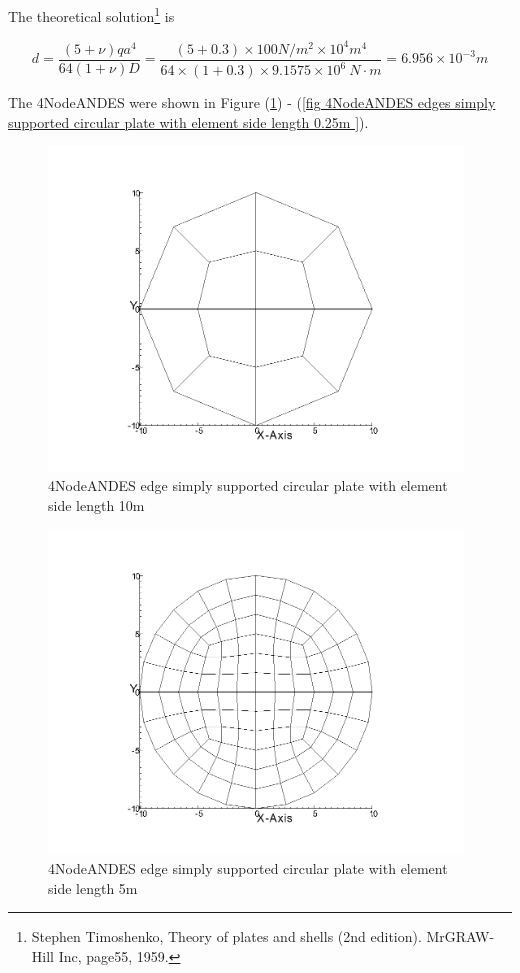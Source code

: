 \documentclass[fleqn,11pt,letter]{article}
\begin{document}
The theoretical solution\footnote{Stephen Timoshenko, Theory of plates and shells (2nd edition). MrGRAW-Hill Inc, page55, 1959.} is 

\begin{equation}
  d= \frac{(5+\nu)  q a^4}{64(1+\nu) D}=\frac{(5+0.3)\times 100 N/m^2 \times 10^4 m^4}{64\times(1+0.3) \times 9.1575 \times 10^6 \ N\cdot m}=6.956\times 10^{-3} m
\end{equation}


The 4NodeANDES were shown in Figure (\ref{fig 4NodeANDES edges simply supported circular plate with element side length 10m }) - (\ref{fig 4NodeANDES edges simply supported circular plate with element side length 0.25m }). 



\begin{figure}[H]
  \centering
  \includegraphics[width=11cm]{../Figure_files/4NodeANDES/circular_plate1.png}
  \caption{4NodeANDES edge simply supported circular plate with element side length 10m }
  \label{fig 4NodeANDES edges simply supported circular plate with element side length 10m }
\end{figure}

\newpage

\begin{figure}[H]
  \centering
  \includegraphics[width=11cm]{../Figure_files/4NodeANDES/circular_plate2.png}
  \caption{4NodeANDES edge simply supported circular plate with element side length 5m }
  \label{fig 4NodeANDES edges simply supported circular plate with element side length 5m }
\end{figure}
\end{document}
